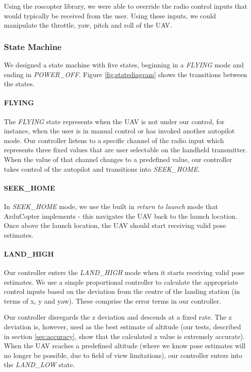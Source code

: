 \documentclass[10pt]{scrartcl} %
\begin{document}
Using the roscopter library, we were able to override the radio control inputs
that would typically be received from the user. Using these inputs, we could
manipulate the throttle, yaw, pitch and roll of the UAV.


\subsubsection{State Machine}

We designed a state machine with five states, beginning in a \textit{FLYING}
mode and ending in \textit{POWER\_OFF}. Figure \ref{fig:statediagram} shows the
transitions between the states.

\paragraph{FLYING}
The \textit{FLYING} state represents when the UAV is not under our control, for
instance, when the user is in manual control or has invoked another autopilot
mode. Our controller listens to a specific channel of the radio input which
represents three fixed values that are user selectable on the handheld
transmitter. When the value of that channel changes to a predefined value, our
controller takes control of the autopilot and transitions into
\textit{SEEK\_HOME}.

\paragraph{SEEK\_HOME}
In \textit{SEEK\_HOME} mode, we use the built in \textit{return to launch} mode
that ArduCopter implements - this navigates the UAV back to the launch
location. Once above the launch location, the UAV should start receiving valid
pose estimates.

\paragraph{LAND\_HIGH}
Our controller enters the \textit{LAND\_HIGH} mode when it starts receiving
valid pose estimates. We use a simple proportional controller to calculate the
appropriate control inputs based on the deviation from the centre of the
landing station (in terms of x, y and yaw). These comprise the error terms in
our controller.

Our controller disregards the z deviation and descends at a fixed rate. The z
deviation is, however, used as the best estimate of altitude (our tests,
described in section \ref{sec:accuracy}, show that the calculated z value is
extremely accurate). When the UAV reaches a predefined altitude (where we know
pose estimates will no longer be possible, due to field of view limitations),
our controller enters into the \textit{LAND\_LOW} state.
\end{document}
